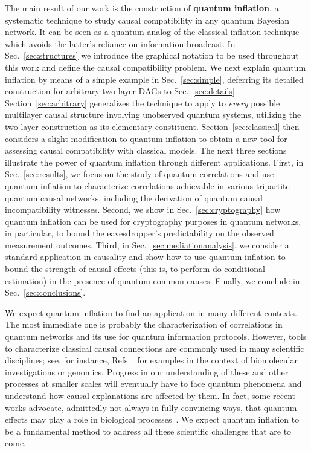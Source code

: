 \documentclass[superscriptaddress,aps,prx,nofootinbib,twocolumn,twoside,reprint,letterpaper,longbibliography]{revtex4-2}
\newcommand{\term}[1]{\textcolor{medblue}{\textbf{#1}}}
\begin{document}
The main result of our work is the construction of \term{quantum inflation}, a systematic technique to study causal compatibility in any quantum Bayesian network.
It can be seen as a quantum analog of the classical inflation technique which avoids the latter's reliance on information broadcast.
In Sec.~\ref{sec:structures} we introduce the graphical notation to be used throughout this work and define the causal compatibility problem.
We next explain quantum inflation by means of a simple example in Sec.~\ref{sec:simple}, deferring its detailed construction for arbitrary two-layer DAGs to Sec.~\ref{sec:details}.
Section~\ref{sec:arbitrary} generalizes the technique to apply to \emph{every} possible multilayer causal structure involving unobserved quantum systems, utilizing the two-layer construction as its elementary constituent. Section~\ref{sec:classical} then considers a slight modification to quantum inflation to obtain a new tool for assessing causal compatibility with classical models.
The next three sections illustrate the power of quantum inflation through different applications.
First, in Sec.~\ref{sec:results}, we focus on the study of quantum correlations and use quantum inflation to characterize correlations achievable in various tripartite quantum causal networks, including the derivation of quantum causal incompatibility witnesses.
Second, we show in Sec.~\ref{sec:cryptography} how quantum inflation can be used for cryptography purposes in quantum networks, in particular, to bound the eavesdropper's predictability on the observed measurement outcomes.
Third, in Sec.~\ref{sec:mediationanalysis}, we consider a standard application in causality and show how to use quantum inflation to bound the strength of causal effects (this is, to perform do-conditional estimation) in the presence of quantum common causes.
Finally, we conclude in Sec.~\ref{sec:conclusions}.

We expect quantum inflation to find an application in many different contexts. The most immediate one is probably the characterization of correlations in quantum networks and its use for quantum information protocols. However, tools to characterize classical causal connections are commonly used in many scientific disciplines; see, for instance, Refs.~\cite{biomolecular,genomics} for examples in the context of biomolecular investigations or genomics. Progress in our understanding of these and other processes at smaller scales will eventually have to face quantum phenomena and understand how causal explanations are affected by them. In fact, some recent works advocate, admittedly not always in fully convincing ways, that quantum effects may play a role in biological processes~\cite{qbio1,qbio2}. We expect quantum inflation to be a fundamental method to address all these scientific challenges that are to come.
\end{document}
